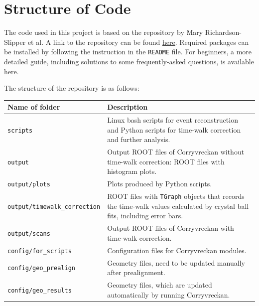 \chapter{Structure of Code}

The code used in this project is based on the repository by Mary Richardson-Slipper et al\cite{MaryRepos}. A link to the repository can be found \href{https://gitlab.cern.ch/ruoyun/part-iii-project.git}{\underline{here}}. Required packages can be installed by following the instruction in the \texttt{README} file. For beginners, a more detailed guide, including solutions to some frequently-asked questions, is available \href{https://docs.google.com/document/d/1eZe5aUjYp-I9UsgxW8yqAF5Ys2iG-Hby9eyUIqivVQg/edit?usp=sharing}{\underline{here}}. 

The structure of the repository is as follows:
\begin{table}[h!]
    \centering
    \begin{tabular}{|p{5.8cm}|m{8.2cm}|} 
         \hline
         Name of folder & Description  \\
         \hline
         \verb|scripts| & Linux bash scripts for event reconstruction and Python scripts for time-walk correction and further analysis.\\
         \hline
         \verb|output| & Output ROOT files of Corryvreckan without time-walk correction: ROOT files with histogram plots.\\
         \hline
         \verb|output/plots| & Plots produced by Python scripts. \\
         \hline
         \verb|output/timewalk_correction| & ROOT files with \texttt{TGraph} objects that records the time-walk values calculated by crystal ball fits, including error bars.\\
         \hline
         \verb|output/scans| & Output ROOT files of Corryvreckan with time-walk correction.\\
         \hline
         \verb|config/for_scripts| & Configuration files for Corryvreckan modules.\\
         \hline
         \verb|config/geo_prealign| & Geometry files, need to be updated manually after prealignment.  \\
         \hline
         \verb|config/geo_results| & Geometry files, which are updated automatically by running Corryvreckan.\\
         \hline
    \end{tabular}
\end{table}

